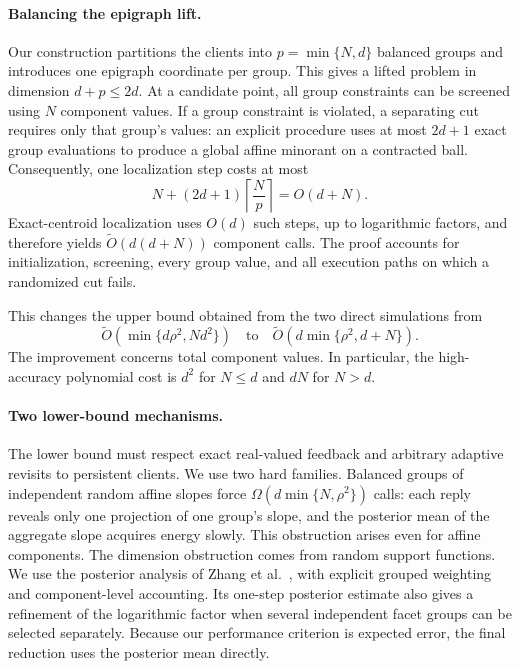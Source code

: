 \documentclass[11pt]{article}
\numberwithin{equation}{section}
\theoremstyle{remark}
\theoremstyle{definition}
\begin{document}
\paragraph{Balancing the epigraph lift.}
Our construction partitions the clients into
$p=\min\{N,d\}$ balanced groups and introduces one epigraph coordinate
per group. This gives a lifted problem in dimension $d+p\le2d$.
At a candidate point, all group constraints can be screened using $N$
component values. If a group constraint is violated, a separating cut
requires only that group's values: an explicit procedure uses at most
$2d+1$ exact group evaluations to produce a global affine minorant on a
contracted ball. Consequently, one localization step costs at most
\begin{equation}
N+(2d+1)\left\lceil\frac{N}{p}\right\rceil=O(d+N).
\label{eq:intro-step-cost}
\end{equation}
Exact-centroid localization uses $O(d)$ such steps, up to logarithmic
factors, and therefore yields $\widetilde O(d(d+N))$ component calls.
The proof accounts for initialization, screening, every group value,
and all execution paths on which a randomized cut fails.

This changes the upper bound obtained from the two direct simulations
from
\begin{equation}
\widetilde O\!\left(\min\{d\rho^2,Nd^2\}\right)
\quad\text{to}\quad
\widetilde O\!\left(d\min\{\rho^2,d+N\}\right).
\label{eq:intro-improvement}
\end{equation}
The improvement concerns total component values. In particular, the
high-accuracy polynomial cost is $d^2$ for $N\le d$ and $dN$ for $N>d$.

\paragraph{Two lower-bound mechanisms.}
The lower bound must respect exact real-valued feedback and arbitrary
adaptive revisits to persistent clients. We use two hard families.
Balanced groups of independent random affine slopes force
$\Omega(d\min\{N,\rho^2\})$ calls: each reply reveals only one
projection of one group's slope, and the posterior mean of the aggregate
slope acquires energy slowly. This obstruction arises even for affine
components. The dimension obstruction comes from random support
functions. We use the posterior analysis of
Zhang et al.~\cite{zzql2026}, with explicit grouped weighting and
component-level accounting. Its one-step posterior estimate also gives
a refinement of the logarithmic factor when several independent facet
groups can be selected separately. Because our performance criterion is
expected error, the final reduction uses the posterior mean directly.
\end{document}
